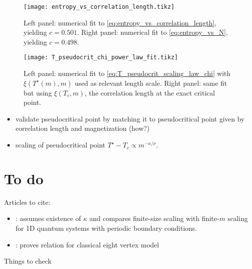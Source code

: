 \begin{figure}
  \texttt{[image: entropy\_vs\_correlation\_length.tikz]}
  \caption{Left panel: numerical fit to \autoref{eq:entropy_vs_correlation_length}, yielding $c = 0.501$. Right panel:
  numerical fit to \autoref{eq:entropy_vs_N}, yielding $c = 0.498$. }\label{fig:entropy_vs_correlation_length}
\end{figure}

\begin{figure}
  \texttt{[image: T\_pseudocrit\_chi\_power\_law\_fit.tikz]}
  \caption{Left panel: numerical fit to \autoref{eq:T_pseudocrit_scaling_law_chi} with $\xi(T^{\star}(m), m)$ used as
  relevant length scale. Right panel: same fit but using $\xi(T_c, m)$, the correlation length at the exact critical
  point.}\label{fig:T_pseudocrit_chi_power_law_fit}
\end{figure}



\begin{itemize}
  \item validate pseudocritical point by matching it to pseudocritical point given by correlation length and
  magnetization (how?)
  \item scaling of pseudocritical point $T^{\star} - T_c \propto m^{-\kappa / \nu}$.
\end{itemize}

\section{To do}

Articles to cite:

\begin{itemize}
\item \cite{pirvu2012matrix}: assumes existence of $\kappa$ and compares finite-size scaling with finite-$m$ scaling
for 1D quantum systems with periodic boundary conditions.
\item \cite{ercolessi2010exact}: proves relation for classical eight vertex model
\end{itemize}

Things to check

